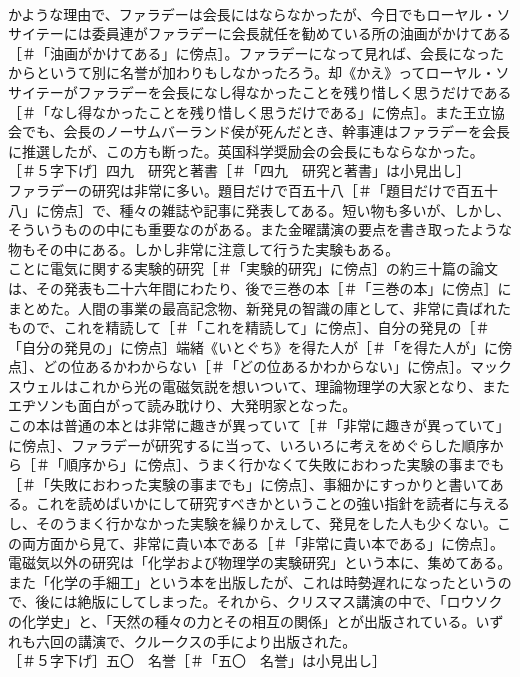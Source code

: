 \documentclass[8pt]{extreport}
\begin{document}
\begin{CJK}{UTF8}{min}
\\	かような理由で、ファラデーは会長にはならなかったが、今日でもローヤル・ソサイテーには委員連がファラデーに会長就任を勧めている所の油画がかけてある［＃「油画がかけてある」に傍点］。ファラデーになって見れば、会長になったからというて別に名誉が加わりもしなかったろう。却《かえ》ってローヤル・ソサイテーがファラデーを会長になし得なかったことを残り惜しく思うだけである［＃「なし得なかったことを残り惜しく思うだけである」に傍点］。また王立協会でも、会長のノーサムバーランド侯が死んだとき、幹事連はファラデーを会長に推選したが、この方も断った。英国科学奨励会の会長にもならなかった。
\\	［＃５字下げ］四九　研究と著書［＃「四九　研究と著書」は小見出し］
\\	ファラデーの研究は非常に多い。題目だけで百五十八［＃「題目だけで百五十八」に傍点］で、種々の雑誌や記事に発表してある。短い物も多いが、しかし、そういうものの中にも重要なのがある。また金曜講演の要点を書き取ったような物もその中にある。しかし非常に注意して行うた実験もある。
\\	ことに電気に関する実験的研究［＃「実験的研究」に傍点］の約三十篇の論文は、その発表も二十六年間にわたり、後で三巻の本［＃「三巻の本」に傍点］にまとめた。人間の事業の最高記念物、新発見の智識の庫として、非常に貴ばれたもので、これを精読して［＃「これを精読して」に傍点］、自分の発見の［＃「自分の発見の」に傍点］端緒《いとぐち》を得た人が［＃「を得た人が」に傍点］、どの位あるかわからない［＃「どの位あるかわからない」に傍点］。マックスウェルはこれから光の電磁気説を想いついて、理論物理学の大家となり、またエヂソンも面白がって読み耽けり、大発明家となった。
\\	この本は普通の本とは非常に趣きが異っていて［＃「非常に趣きが異っていて」に傍点］、ファラデーが研究するに当って、いろいろに考えをめぐらした順序から［＃「順序から」に傍点］、うまく行かなくて失敗におわった実験の事までも［＃「失敗におわった実験の事までも」に傍点］、事細かにすっかりと書いてある。これを読めばいかにして研究すべきかということの強い指針を読者に与えるし、そのうまく行かなかった実験を繰りかえして、発見をした人も少くない。この両方面から見て、非常に貴い本である［＃「非常に貴い本である」に傍点］。
\\	電磁気以外の研究は「化学および物理学の実験研究」という本に、集めてある。また「化学の手細工」という本を出版したが、これは時勢遅れになったというので、後には絶版にしてしまった。それから、クリスマス講演の中で、「ロウソクの化学史」と、「天然の種々の力とその相互の関係」とが出版されている。いずれも六回の講演で、クルークスの手により出版された。
\\	［＃５字下げ］五〇　名誉［＃「五〇　名誉」は小見出し］

\end{CJK}
\end{document}
